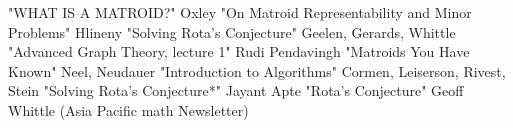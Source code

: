
\begin{thebibliography}{10}

"WHAT IS A MATROID?" Oxley
"On Matroid Representability and Minor Problems" Hlineny
"Solving Rota’s Conjecture" Geelen, Gerards, Whittle
"Advanced Graph Theory, lecture 1" Rudi Pendavingh
"Matroids You Have Known" Neel, Neudauer
"Introduction to Algorithms" Cormen, Leiserson, Rivest, Stein
"Solving Rota's Conjecture*" Jayant Apte
"Rota's Conjecture" Geoff Whittle (Asia Pacific math Newsletter)

\end{thebibliography}
